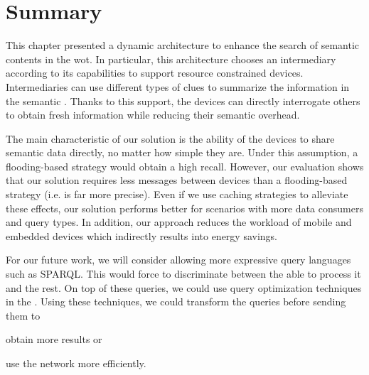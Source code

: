 \section{Summary}
\label{sec:search_summary}

This chapter presented a dynamic architecture to enhance the search of semantic contents in the \acl{wot}.
In particular, this architecture chooses an intermediary according to its capabilities to support resource constrained devices.
Intermediaries can use different types of clues to summarize the information in the semantic \Space{}.
Thanks to this support, the devices can directly interrogate others to obtain fresh information while reducing their semantic overhead.

The main characteristic of our solution is the ability of the devices to share semantic data directly, no matter how simple they are. %
Under this assumption, a flooding-based strategy would obtain a high recall. %
However, our evaluation shows that our solution requires less messages between devices than a flooding-based strategy (i.e. is far more precise).
Even if we use caching strategies to alleviate these effects, our solution performs better for scenarios with more data consumers and query types.
In addition, our approach reduces the workload of mobile and embedded devices which indirectly results into energy savings.

For our future work, we will consider allowing more expressive query languages such as SPARQL. %
This would force \consumers{} to discriminate between the \providers{} able to process it and the rest.
On top of these queries, we could use query optimization techniques in the \consumers{} \citep{schwarte_fedx_optimization_2011}.
Using these techniques, we could transform the queries before sending them to
\begin{enumerate*}[label=\itshape(\alph*\upshape)]
  \item obtain more results or
  \item use the network more efficiently.
\end{enumerate*}